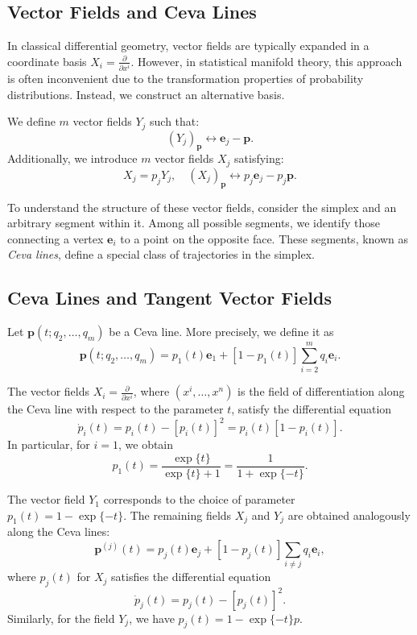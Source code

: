 \subsection{Vector Fields and Ceva Lines}

In classical differential geometry, vector fields are typically expanded in a coordinate basis $X_i = \frac{\partial}{\partial x^i}$. However, in statistical manifold theory, this approach is often inconvenient due to the transformation properties of probability distributions. Instead, we construct an alternative basis.

We define $m$ vector fields $Y_j$ such that:
\[
(Y_j)_{\mathbf{p}} \leftrightarrow  \mathbf{e}_j  - \mathbf{p}.
\]
Additionally, we introduce $m$ vector fields $X_j$ satisfying:
\[
X_j= p_j Y_j, \quad (X_j)_{\mathbf{p}} \leftrightarrow  p_j \mathbf{e}_j - p_j \mathbf{p}.
\]

To understand the structure of these vector fields, consider the simplex and an arbitrary segment within it. Among all possible segments, we identify those connecting a vertex $\mathbf{e}_i$ to a point on the opposite face. These segments, known as \emph{Ceva lines}, define a special class of trajectories in the simplex.


\subsection{Ceva Lines and Tangent Vector Fields}

Let $\mathbf{p}(t; q_2,\dots,q_m)$ be a Ceva line. More precisely, we define it as
\[
\mathbf{p}(t;q_2,\dots,q_m)= p_1(t)\mathbf{e}_1 + [1 - p_1(t)] \sum_{i=2}^m q_i \mathbf{e}_i.
\]

\begin{lemma}
The vector fields $X_i = \frac{\partial}{\partial x^i}$, where $(x^i,\dots,x^n)$ is the field of differentiation along the Ceva line with respect to the parameter $t$, satisfy the differential equation
\[
\dot{p}_i(t) = p_i(t) - [p_i(t)]^2 = p_i(t) [1 - p_i(t)].
\]
In particular, for $i=1$, we obtain
\[
p_1(t)= \frac{\exp\{t\}}{\exp\{t\}+1} = \frac{1}{1+\exp\{-t\}}.
\] 
\end{lemma}

\begin{remark}
    The vector field $Y_1$ corresponds to the choice of parameter $p_1(t) =1 - \exp\{ -t \}$. The remaining fields $X_j$
    and $Y_j$ are obtained analogously along the Ceva lines:
    \[
    \mathbf{p}^{(j)}(t) = p_j(t) \mathbf{e}_j + [ 1 - p_j(t)] \sum_{i \neq j} q_i \mathbf{e}_i,
    \]
    where $p_j(t)$ for $X_j$ satisfies the differential equation
    \[
    \dot{p}_j (t) = p_j (t) - [ p_j(t)]^2.
    \]
    Similarly, for the field $Y_j$, we have $p_j(t)= 1 - \exp\{-t\}p$.
\end{remark}

